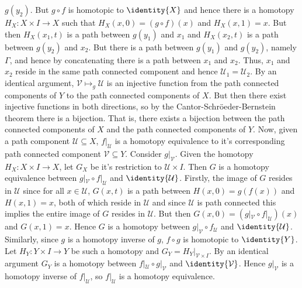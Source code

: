 \documentclass{article}                                                        %
\begin{document}
\begin{solution}
        $g(y_{2})$. But $g\circ{f}$ is homotopic to $\identity{X}$
        and hence there is a homotopy $H_{X}:X\times{I}\rightarrow{X}$ such that
        $H_{X}(x,0)=(g\circ{f})(x)$ and $H_{X}(x,1)=x$. But then
        $H_{X}(x_{1},t)$ is a path between $g(y_{1})$ and $x_{1}$ and
        $H_{X}(x_{2},t)$ is a path between $g(y_{2})$ and $x_{2}$. But there is
        a path between $g(y_{1})$ and $g(y_{2})$, namely $\Gamma$, and hence by
        concatenating there is a path between $x_{1}$ and $x_{2}$. Thus,
        $x_{1}$ and $x_{2}$ reside in the same path connected component and
        hence $\mathcal{U}_{1}=\mathcal{U}_{2}$. By an identical argument,
        $\mathcal{V}\mapsto_{g}\mathcal{U}$ is an injective function from the
        path connected components of $Y$ to the path connected components of
        $X$. But then there exist injective functions in both directions, so by
        the Cantor-Schr\"{o}eder-Bernstein theorem there is a bijection. That
        is, there exists a bijection between the path connected components
        of $X$ and the path connected components of $Y$. Now, given a path
        component $\mathcal{U}\subseteq{X}$, $f|_{\mathcal{U}}$ is a homotopy
        equivalence to it's corresponding path connected component
        $\mathcal{V}\subseteq{Y}$. Consider $g|_{\mathcal{V}}$. Given the
        homotopy $H_{X}:X\times{I}\rightarrow{X}$, let $G_{X}$ be it's
        restriction to $\mathcal{U}\times{I}$. Then $G$ is a homotopy
        equivalence between $g|_{\mathcal{V}}\circ{f}|_{\mathcal{U}}$ and
        $\identity{\mathcal{U}}$. Firstly, the image of $G$ resides in
        $\mathcal{U}$ since for all $x\in\mathcal{U}$, $G(x,t)$ is a path
        between $H(x,0)=g(f(x))$ and $H(x,1)=x$, both of which reside in
        $\mathcal{U}$ and since $\mathcal{U}$ is path connected this implies the
        entire image of $G$ resides in $\mathcal{U}$. But then
        $G(x,0)=(g|_{\mathcal{V}}\circ{f}|_{\mathcal{U}})(x)$ and $G(x,1)=x$.
        Hence $G$ is a homotopy between $g|_{\mathcal{V}}\circ{f}_{\mathcal{U}}$
        and $\identity{\mathcal{U}}$. Similarly, since $g$ is a homotopy inverse
        of $g$, $f\circ{g}$ is homotopic to $\identity{Y}$. Let
        $H_{Y}:Y\times{I}\rightarrow{Y}$ be such a homotopy and
        $G_{Y}=H_{Y}|_{\mathcal{V}\times{I}}$. By an identical argument $G_{Y}$
        is a homotopy between $f|_{\mathcal{U}}\circ{g}|_{\mathcal{V}}$ and
        $\identity{\mathcal{V}}$. Hence $g|_{\mathcal{V}}$ is a homotopy inverse
        of $f|_{\mathcal{U}}$, so $f|_{\mathcal{U}}$ is a homotopy equivalence.

\end{solution}
\end{document}
